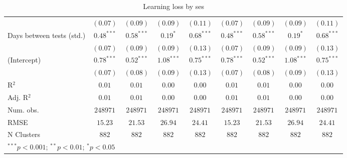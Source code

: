 \begin{table}
\begin{center}
\begin{tabular}{l c c c c c c c c}
                            & $(0.07)$      & $(0.09)$      & $(0.09)$      & $(0.11)$      & $(0.07)$      & $(0.09)$      & $(0.09)$      & $(0.11)$      \\
Days between tests (std.)   & $0.48^{***}$  & $0.58^{***}$  & $0.19^{*}$    & $0.68^{***}$  & $0.48^{***}$  & $0.58^{***}$  & $0.19^{*}$    & $0.68^{***}$  \\
                            & $(0.07)$      & $(0.09)$      & $(0.09)$      & $(0.13)$      & $(0.07)$      & $(0.09)$      & $(0.09)$      & $(0.13)$      \\
(Intercept)                 & $0.78^{***}$  & $0.52^{***}$  & $1.08^{***}$  & $0.75^{***}$  & $0.78^{***}$  & $0.52^{***}$  & $1.08^{***}$  & $0.75^{***}$  \\
                            & $(0.07)$      & $(0.08)$      & $(0.09)$      & $(0.13)$      & $(0.07)$      & $(0.08)$      & $(0.09)$      & $(0.13)$      \\
\hline
R$^2$                       & $0.01$        & $0.01$        & $0.00$        & $0.00$        & $0.01$        & $0.01$        & $0.00$        & $0.00$        \\
Adj. R$^2$                  & $0.01$        & $0.01$        & $0.00$        & $0.00$        & $0.01$        & $0.01$        & $0.00$        & $0.00$        \\
Num. obs.                   & $248971$      & $248971$      & $248971$      & $248971$      & $248971$      & $248971$      & $248971$      & $248971$      \\
RMSE                        & $15.23$       & $21.53$       & $26.94$       & $24.41$       & $15.23$       & $21.53$       & $26.94$       & $24.41$       \\
N Clusters                  & $882$         & $882$         & $882$         & $882$         & $882$         & $882$         & $882$         & $882$         \\
\hline
\multicolumn{9}{l}{\scriptsize{$^{***}p<0.001$; $^{**}p<0.01$; $^{*}p<0.05$}}
\end{tabular}
\caption{Learning loss by ses}
\label{table:ses_match}
\end{center}
\end{table}

